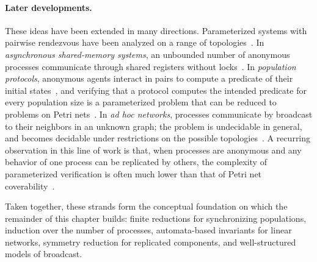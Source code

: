 \paragraph{Later developments.}
These ideas have been extended in many directions. Parameterized systems with
pairwise rendezvous have been analyzed on a range of
topologies~\cite{AKRSV18}. In \emph{asynchronous shared-memory systems}, an
unbounded number of anonymous processes communicate through shared registers
without locks~\cite{EGM16}. In \emph{population protocols}, anonymous agents
interact in pairs to compute a predicate of their initial
states~\cite{AADFP06}, and verifying that a protocol computes the intended
predicate for every population size is a parameterized problem that can be
reduced to problems on Petri nets~\cite{EGLM17}. In \emph{ad hoc networks},
processes communicate by broadcast to their neighbors in an unknown graph; the
problem is undecidable in general, and becomes decidable under restrictions on
the possible topologies~\cite{DSZ10}. A recurring observation in this line of
work is that, when processes are anonymous and any behavior of one process can
be replicated by others, the complexity of parameterized verification is often
much lower than that of Petri net coverability~\cite{Esp14}.

Taken together, these strands form the conceptual foundation on which the
remainder of this chapter builds: finite reductions for synchronizing
populations, induction over the number of processes, automata-based
invariants for linear networks, symmetry reduction for replicated components,
and well-structured models of broadcast.
